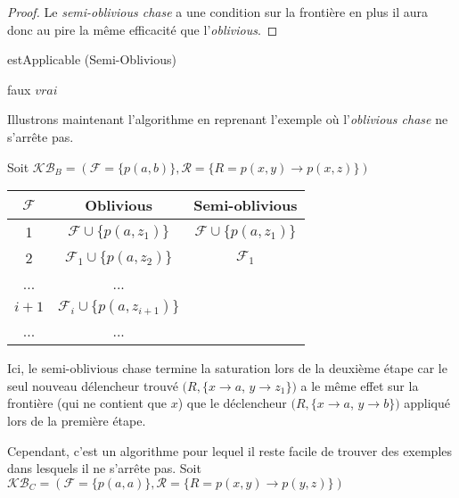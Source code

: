 \begin{proof} Le \textit{semi-oblivious chase} a une condition sur la frontière en plus il aura donc au pire la même efficacité que l'\textit{oblivious}.
\end{proof}

\begin{algorithm}[H]\label{algo:est_applicable_semi_oblivious}
\caption{estApplicable (Semi-Oblivious)}
\SetAlgoLined
\DontPrintSemicolon
{}
    {
        \Return faux
    }
\Return $vrai$
\end{algorithm}
Illustrons maintenant l'algorithme en reprenant l'exemple où l'\textit{oblivious chase} ne s'arrête pas.
\par Soit $\mathcal{KB}_B = (\mathcal{F} = \{p(a,b)\}, \mathcal{R} = \{R = p(x,y) \rightarrow p(x,z) \})$

\begin{center}
\begin{tabular}{|c|c|c|}
    \hline
    $\mathcal{F}$ & Oblivious & Semi-oblivious \\ 
    \hline
    1 &$\mathcal{F} \cup \{p(a, z_1)\}$ & $\mathcal{F} \cup \{p(a, z_1)\} $\\ 
    \hline
    2 &$\mathcal{F}_1 \cup \{p(a, z_2)\}$ &$\mathcal{F}_1$\\
    \hline
    ... & ... & \\
    \hline
    $i+1$ & $\mathcal{F}_i \cup \{p(a, z_{i+1})\} $& \\
     \hline
     ... & ... & \\
     \hline
\end{tabular}
\end{center}

Ici, le semi-oblivious chase termine la saturation lors de la deuxième étape car le seul nouveau délencheur trouvé $(R,\{x \rightarrow a$, $y \rightarrow z_1\})$ a le même effet sur la frontière (qui ne contient que $x$) que le déclencheur $(R,\{x \rightarrow a$, $y \rightarrow b\})$ appliqué lors de la première étape.  

\par Cependant, c'est un algorithme pour lequel il reste facile de trouver des exemples dans lesquels il ne s'arrête pas.
Soit $\mathcal{KB}_C = (\mathcal{F} = \{p(a,a)\}, \mathcal{R} = \{R = p(x,y) \rightarrow p(y,z) \})$

